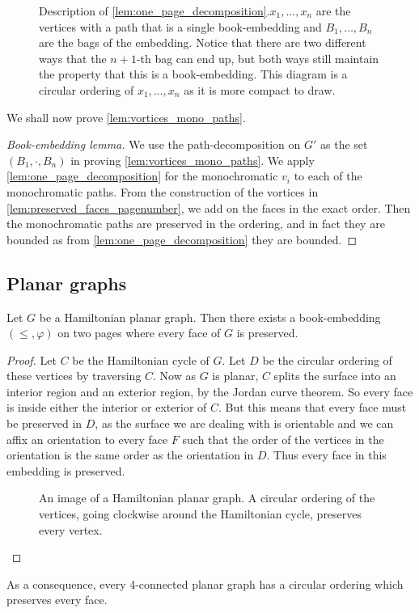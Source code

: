 \begin{figure}
	\centering
	
	\caption[One-page decomposition]{Description of \cref{lem:one_page_decomposition}.\(x_1, \ldots, x_n\) are the vertices with a path that is a single book-embedding and \(B_1, \ldots, B_n\) are the bags of the embedding. Notice that there are two different ways that the \(n + 1\)-th bag can end up, but both ways still maintain the property that this is a book-embedding. This diagram is a circular ordering of \(x_1, \ldots, x_n\) as it is more compact to draw.}\label{fig:preserving_pages}
\end{figure}

We shall now prove \cref{lem:vortices_mono_paths}.
\begin{proof}[Book-embedding lemma]
	We use the path-decomposition on \(G'\) as the set \((B_1, \cdot , B_n)\) in proving \cref{lem:vortices_mono_paths}. We apply \cref{lem:one_page_decomposition} for the monochromatic \(v_i\) to each of the monochromatic paths. From the construction of the vortices in \cref{lem:preserved_faces_pagenumber}, we add on the faces in the exact order. Then the monochromatic paths are preserved in the ordering, and in fact they are bounded as from \cref{lem:one_page_decomposition} they are bounded.
\end{proof}
\subsection{Planar graphs}
\begin{lemma}\label{lem:Hamiltonian_preserved_faces}
	Let \(G\) be a Hamiltonian planar graph. Then there exists a book-embedding $(\leq, \varphi)$ on two pages where every face of $G$ is preserved.
\end{lemma}

\begin{proof}
	Let \(C\) be the Hamiltonian cycle of \(G\). Let \(D\) be the circular ordering of these vertices by traversing \(C\). Now as \(G\) is planar, \(C\) splits the surface into an interior region and an exterior region, by the Jordan curve theorem. So every face is inside either the interior or exterior of \(C\). But this means that every face must be preserved in \(D\), as the surface we are dealing with is orientable and we can affix an orientation to every face \(F\) such that the order of the vertices in the orientation is the same order as the orientation in \(D\). Thus every face in this embedding is preserved.
	\begin{figure}[h]
		\centering
		
		\caption{An image of a Hamiltonian planar graph. A circular ordering of the vertices, going clockwise around the Hamiltonian cycle, preserves every vertex.}\label{fig:hamiltonian_planar}
	\end{figure}
\end{proof}
As a consequence, every 4-connected planar graph has a circular ordering which preserves every face.

